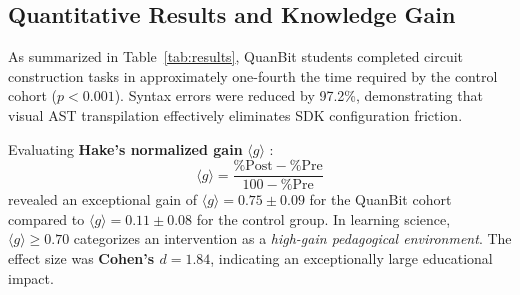 \documentclass[conference]{IEEEtran}
\begin{document}
\subsection{Quantitative Results and Knowledge Gain}
As summarized in Table~\ref{tab:results}, QuanBit students completed circuit construction tasks in approximately one-fourth the time required by the control cohort ($p < 0.001$). Syntax errors were reduced by 97.2\%, demonstrating that visual AST transpilation effectively eliminates SDK configuration friction.

Evaluating \textbf{Hake's normalized gain} $\langle g \rangle$ \cite{b14}:
\begin{equation}
\langle g \rangle = \frac{\% \text{Post} - \% \text{Pre}}{100 - \% \text{Pre}}
\end{equation}
revealed an exceptional gain of $\langle g \rangle = 0.75 \pm 0.09$ for the QuanBit cohort compared to $\langle g \rangle = 0.11 \pm 0.08$ for the control group. In learning science, $\langle g \rangle \ge 0.70$ categorizes an intervention as a \textit{high-gain pedagogical environment}. The effect size was \textbf{Cohen's $d = 1.84$}, indicating an exceptionally large educational impact.

\begin{table}[htbp]
\caption{Domain-Specific Conceptual Mastery Breakdown ($N=30$)}
\label{tab:domain_results}
\centering
\renewcommand{\arraystretch}{1.03}
\end{table}
\end{document}
